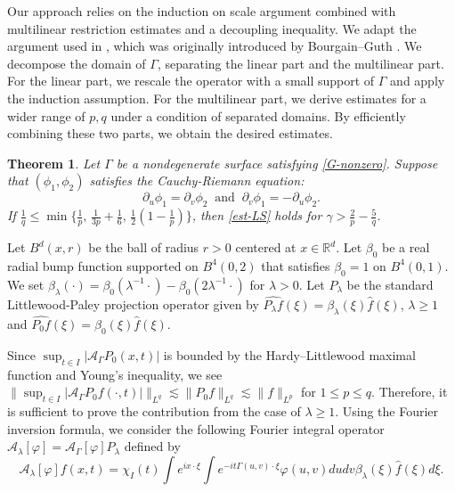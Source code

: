 \documentclass[10pt] %
{amsart}
\theoremstyle{plain}
\newtheorem{thm}{Theorem}[section]
\numberwithin{equation}{section}
\newcommand{\R}{\mathbb R}
\begin{document}
Our approach relies on the induction on scale argument combined with multilinear restriction estimates and a decoupling inequality. 
We adapt the argument used in \cite{KLO23}, which was originally introduced by Bourgain--Guth \cite{BG}. We decompose the domain of $\Gamma$, separating the linear part and the multilinear part. For the linear part, we rescale the operator with a small support of $\Gamma$ and apply the induction assumption. 
For the multilinear part, we derive estimates for a wider range of $p,q$ under a condition of separated domains. 
By efficiently combining these two parts, we obtain the desired estimates. 
 



\begin{thm}\label{LS-com}
Let $\Gamma$ be a nondegenerate surface satisfying \eqref{G-nonzero}. 
Suppose that $(\phi_1,\phi_2)$ satisfies the Cauchy-Riemann equation: 
\begin{equation}\label{holo}
\partial_u  \phi_1 = \partial_v \phi_2 ~\text{ and }~\partial_v \phi_1 = -\partial_u \phi_2 .
\end{equation}
If $\frac 1 q \le \min\{ \frac 1p,\, \frac 1{3p}+\frac16,\, \frac12(1-\frac1p)\}$,
then \eqref{est-LS} holds for $\gamma > \frac 2p -\frac 5 q$. 
\end{thm}



Let $B^d(x,r)$ be the ball of radius $r>0$ centered at $x\in \R^d$.
Let $\beta_0$ be a real radial bump function supported on $B^4(0,2)$ that satisfies $\beta_0=1$ on $B^4(0,1)$. 
We set $\beta_\lambda(\cdot)=\beta_0(\lambda^{-1}\cdot)-\beta_0( 2\lambda^{-1}\cdot)$ for $\lambda>0$.
Let $P_\lambda$ be the standard Littlewood-Paley projection operator given by $\widehat{P_\lambda f}(\xi) = \beta_\lambda (\xi)\widehat f(\xi)$, $\lambda \ge1$ and $\widehat{P_0f}(\xi)=\beta_0(\xi)\widehat f(\xi)$.

Since $\sup_{t \in I } |\mathcal A_\Gamma P_0(x,t) |$ is bounded by the Hardy--Littlewood maximal function and Young's inequality, we see $\| \sup_{t \in I } |\mathcal A_\Gamma P_0 f(\cdot,t)| \|_{L^q} \lesssim \|P_0 f\|_{L^q}\lesssim  \|f\|_{L^p}$ for $1\le p \le q$. 
Therefore, 
it is sufficient to prove the contribution 
from the case of  $\lambda \ge1$.  
Using the Fourier inversion formula, we consider the following Fourier integral operator $ \mathcal A_\lambda  [\varphi] 
=\mathcal A_\Gamma [\varphi] P_\lambda $ defined by 
\[  
\mathcal A_\lambda [\varphi]f(x,t) = \chi_I(t)\int e^{ix\cdot\xi} \int e^{-it\Gamma(u,v)\cdot \xi}  \varphi  ( u,v) du dv \beta_\lambda(\xi) \widehat{f} (\xi) d\xi .
\]
 
\end{document}
